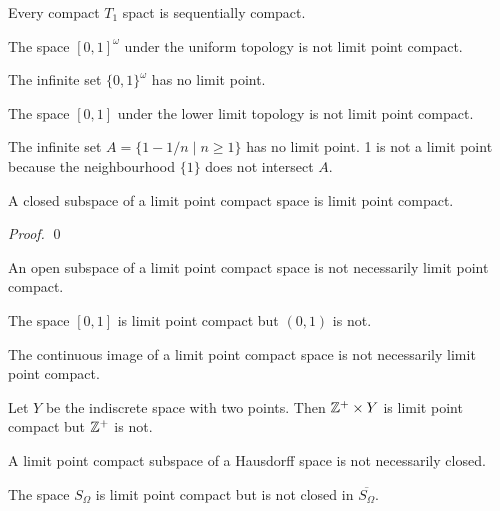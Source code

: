 \begin{corollary}
    \label{corollary:compact_sequentially_compact}
    Every compact $T_1$ spact is sequentially compact.
\end{corollary}

\begin{example}
    The space $[0,1]^\omega$ under the uniform topology is not limit point compact.

    The infinite set $\{0,1\}^\omega$ has no limit point.
\end{example}

\begin{example}
    The space $[0,1]$ under the lower limit topology is not limit point compact.

    The infinite set $A = \{ 1 - 1/n \mid n \geq 1 \}$ has no limit point. 1 is not a limit point
    because the neighbourhood $\{1\}$ does not intersect $A$.
\end{example}

\begin{proposition}
    A closed subspace of a limit point compact space is limit point compact.
\end{proposition}

\begin{proof}
    \pf
    \qed
\end{proof}

\begin{example}
    An open subspace of a limit point compact space is not necessarily limit point compact.

    The space $[0,1]$ is limit point compact but $(0,1)$ is not.
\end{example}

\begin{example}
    The continuous image of a limit point compact space is not necessarily limit point compact.

    Let $Y$ be the indiscrete space with two points. Then $\mathbb{Z}^+ \times Y$ is limit point compact but $\mathbb{Z}^+$
    is not.
\end{example}

\begin{example}
    A limit point compact subspace of a Hausdorff space is not necessarily closed.

    The space $S_\Omega$ is limit point compact but is not closed in $\overline{S_\Omega}$.
\end{example}


